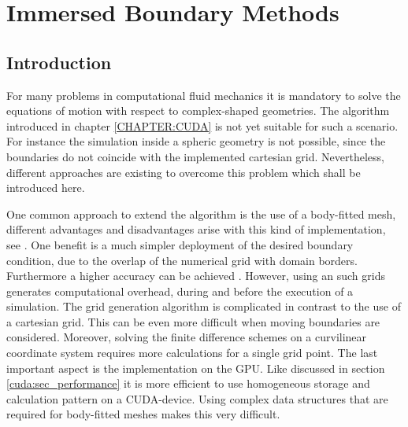 \chapter{Immersed Boundary Methods}
\label{CHAPTER:IBM}

\section{Introduction}

For many problems in computational fluid mechanics it is mandatory to solve the equations of motion with respect to complex-shaped geometries.
The algorithm introduced in chapter \ref{CHAPTER:CUDA} is not yet suitable for such a scenario.
For instance the simulation inside a spheric geometry is not possible, since the boundaries
do not coincide with the implemented cartesian grid. Nevertheless,  different approaches are existing to overcome this problem
which shall be introduced here.

One common approach to extend the algorithm is the use of a body-fitted mesh,
different advantages and disadvantages arise with this kind of implementation, see \citep{Mittal2005}.
One benefit is a much simpler deployment of the desired boundary condition, due to the overlap of the numerical grid with domain borders.
Furthermore a higher accuracy can be achieved \citep{Gornak2013}.
However, using an such grids generates  computational overhead, during and before the execution of a simulation.
The grid generation algorithm is complicated in contrast to the use of a cartesian grid. This can be even more difficult when
moving boundaries are considered.
Moreover, solving the finite difference schemes on a curvilinear coordinate system requires more calculations for a single grid point.
The last important aspect is the implementation on the GPU.
Like discussed in section \ref{cuda:sec_performance} it is more efficient to use homogeneous storage and calculation pattern on a CUDA-device.
Using complex data structures that are required for body-fitted meshes makes this very difficult.

